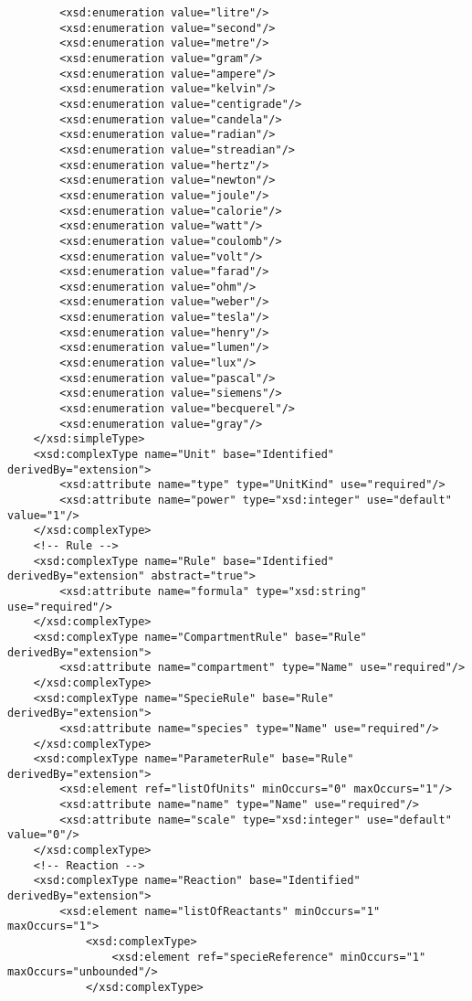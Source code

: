 \documentclass[10pt]{cek-article}
\begin{document}
\begin{small}
\begin{verbatim}
        <xsd:enumeration value="litre"/>
        <xsd:enumeration value="second"/>
        <xsd:enumeration value="metre"/>
        <xsd:enumeration value="gram"/>
        <xsd:enumeration value="ampere"/>
        <xsd:enumeration value="kelvin"/>
        <xsd:enumeration value="centigrade"/>
        <xsd:enumeration value="candela"/>
        <xsd:enumeration value="radian"/>
        <xsd:enumeration value="streadian"/>
        <xsd:enumeration value="hertz"/>
        <xsd:enumeration value="newton"/>
        <xsd:enumeration value="joule"/>
        <xsd:enumeration value="calorie"/>
        <xsd:enumeration value="watt"/>
        <xsd:enumeration value="coulomb"/>
        <xsd:enumeration value="volt"/>
        <xsd:enumeration value="farad"/>
        <xsd:enumeration value="ohm"/>
        <xsd:enumeration value="weber"/>
        <xsd:enumeration value="tesla"/>
        <xsd:enumeration value="henry"/>
        <xsd:enumeration value="lumen"/>
        <xsd:enumeration value="lux"/>
        <xsd:enumeration value="pascal"/>
        <xsd:enumeration value="siemens"/>
        <xsd:enumeration value="becquerel"/>
        <xsd:enumeration value="gray"/>
    </xsd:simpleType>
    <xsd:complexType name="Unit" base="Identified" derivedBy="extension">
        <xsd:attribute name="type" type="UnitKind" use="required"/>
        <xsd:attribute name="power" type="xsd:integer" use="default" value="1"/>
    </xsd:complexType>
    <!-- Rule -->
    <xsd:complexType name="Rule" base="Identified" derivedBy="extension" abstract="true">
        <xsd:attribute name="formula" type="xsd:string" use="required"/>
    </xsd:complexType>
    <xsd:complexType name="CompartmentRule" base="Rule" derivedBy="extension">
        <xsd:attribute name="compartment" type="Name" use="required"/>
    </xsd:complexType>
    <xsd:complexType name="SpecieRule" base="Rule" derivedBy="extension">
        <xsd:attribute name="species" type="Name" use="required"/>
    </xsd:complexType>
    <xsd:complexType name="ParameterRule" base="Rule" derivedBy="extension">
        <xsd:element ref="listOfUnits" minOccurs="0" maxOccurs="1"/>
        <xsd:attribute name="name" type="Name" use="required"/>
        <xsd:attribute name="scale" type="xsd:integer" use="default" value="0"/>
    </xsd:complexType>
    <!-- Reaction -->
    <xsd:complexType name="Reaction" base="Identified" derivedBy="extension">
        <xsd:element name="listOfReactants" minOccurs="1" maxOccurs="1">
            <xsd:complexType>
                <xsd:element ref="specieReference" minOccurs="1" maxOccurs="unbounded"/>
            </xsd:complexType>

\end{verbatim}
\end{small}
\end{document}
